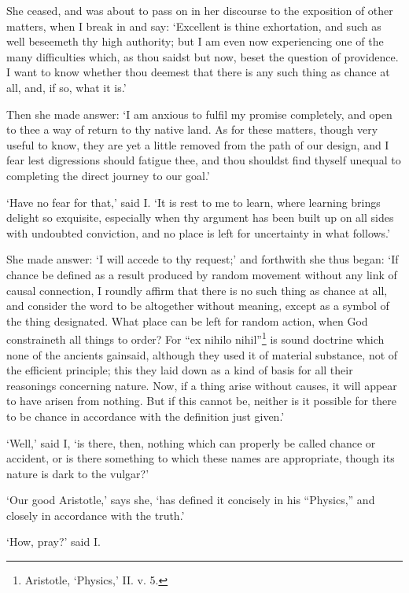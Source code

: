\documentclass[12pt]{book}
\begin{document}
She ceased, and was about to pass on in her discourse to the exposition
of other matters, when I break in and say: `Excellent is thine
exhortation, and such as well beseemeth thy high authority; but I am
even now experiencing one of the many difficulties which, as thou saidst
but now, beset the question of providence. I want to know whether thou
deemest that there is any such thing as chance at all, and, if so, what
it is.'

Then she made answer: `I am anxious to fulfil my promise completely, and
open to thee a way of return to thy native land. As for these matters,
though very useful to know, they are yet a little removed from the path
of our design, and I fear lest digressions should fatigue thee, and thou
shouldst find thyself unequal to completing the direct journey to our
goal.'

`Have no fear for that,' said I. `It is rest to me to learn, where
learning brings delight so exquisite, especially when thy argument has
been built up on all sides with undoubted conviction, and no place is
left for uncertainty in what follows.'

She made answer: `I will accede to thy request;' and forthwith she thus
began: `If chance be defined as a result produced by random movement
without any link of causal connection, I roundly affirm that there is no
such thing as chance at all, and consider the word to be altogether
without meaning, except as a symbol of the thing designated. What place
can be left for random action, when God constraineth all things to
order? For ``ex nihilo nihil''\footnote{Aristotle, `Physics,’ II. v. 5.} is sound doctrine which none of the
ancients gainsaid, although they used it of material substance, not of
the efficient principle; this they laid down as a kind of basis for all
their reasonings concerning nature. Now, if a thing arise without
causes, it will appear to have arisen from nothing. But if this cannot
be, neither is it possible for there to be chance in accordance with the
definition just given.'

`Well,' said I, `is there, then, nothing which can properly be called
chance or accident, or is there something to which these names are
appropriate, though its nature is dark to the vulgar?'

`Our good Aristotle,' says she, `has defined it concisely in his
``Physics,'' and closely in accordance with the truth.'

`How, pray?' said I.
\end{document}
